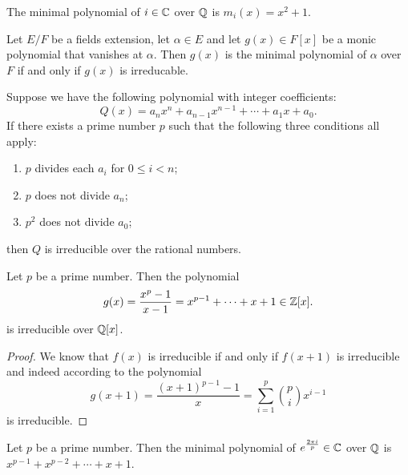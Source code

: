 \documentclass[11pt,a4paper]{article}
\begin{document}
\begin{example}
  The minimal polynomial of $i \in \mathbb{C}$ over $\mathbb{Q}$ is $m_i(x) = x^2 + 1$.
\end{example}

\begin{proposition}
  Let $E/F$ be a fields extension,
  let $\alpha \in E$ and
  let $g(x) \in F[x]$ be a monic polynomial that vanishes at $\alpha$.
  Then $g(x)$ is the minimal polynomial of $\alpha$ over $F$ if and only
  if $g(x)$ is irreducable.
\end{proposition}

\begin{theorem}
  \label{thm:eisensteins-criterion}
  Suppose we have the following polynomial with integer coefficients:
  \[
    Q(x) = a_{n} x^{n} + a_{n-1} x^{n-1} + \cdots + a_{1} x + a_{0}.
  \]
  If there exists a prime number $p$
  such that the following three conditions all apply:
  \begin{enumerate}
    \item[(1)] $p$ divides each $a_i$ for $0 \le i < n$;
    \item[(2)] $p$ does not divide $a_n$;
    \item[(3)] $p^2$ does not divide $a_0$;
  \end{enumerate}
  then $Q$ is irreducible over the rational numbers.
\end{theorem}

\begin{corollary}
  Let $p$ be a prime number.
  Then the polynomial
  \[
    g(x) = \frac{x^p - 1}{x - 1} = x^{p-1} + \cdots + x + 1 \in \mathbb{Z}[x].
  \]
  is irreducible over $\mathbb{Q}[x]$.
\end{corollary}
\begin{proof}
  We know that $f(x)$ is irreducible if and only if $f(x+1)$ is irreducible
  and indeed according to  the polynomial
  \[
    g(x+1) =
    \frac{(x+1)^{p-1} - 1}{x} =
    \sum_{i=1}^{p} \binom{p}{i} x^{i-1}
  \]
  is irreducible.
\end{proof}

\begin{corollary}
  \label{cor:special-polynomial}
  Let $p$ be a prime number.
  Then the minimal polynomial of $e^{\frac{2 \pi i}{p}} \in \mathbb{C}$ over $\mathbb{Q}$
  is $x^{p-1} + x^{p-2} + \cdots + x + 1$.
\end{corollary}
\end{document}
